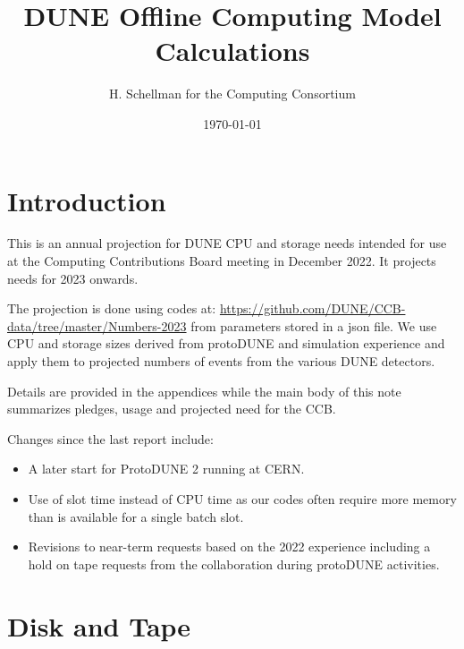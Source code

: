 \documentclass[12pt]{article}
\title{DUNE Offline Computing Model Calculations}
\author{H. Schellman for the Computing Consortium}
\date{\today}
\begin{document}
\makeatletter
{}
\makeatother
\newcommand{\csvautotabularright}[2][]{\csvloop{autotabularright={#2},#1}}

\maketitle
\section{Introduction}

This is an annual projection for DUNE CPU and storage needs intended for use at the Computing Contributions Board meeting in December 2022. It projects needs for 2023 onwards. 

The projection is done using codes at: \href{https://github.com/DUNE/CCB-data/tree/master/Numbers-2023}{https://github.com/DUNE/CCB-data/tree/master/Numbers-2023} from parameters stored in a json file. We use CPU and storage sizes derived from protoDUNE and simulation experience and apply them to projected numbers of events from the various DUNE detectors. 

Details are provided in the appendices while the main body of this note summarizes pledges, usage and projected need for the CCB.

Changes since the last report include:

\begin{itemize}
\item A later start for ProtoDUNE 2 running at CERN.
\item Use of slot time instead of CPU time as our codes often require more memory than is available for a single batch slot. 
\item Revisions to near-term requests based on the 2022 experience including a hold on tape requests from the collaboration during protoDUNE activities. 
\end{itemize}


\section{Disk and Tape}
\end{document}
